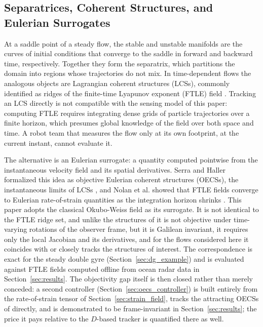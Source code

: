 \documentclass[lettersize,journal]{IEEEtran}
\begin{document}
\subsection{Separatrices, Coherent Structures, and Eulerian Surrogates}
\label{sec:separatrix}

At a saddle point of a steady flow, the stable and unstable manifolds are
the curves of initial conditions that converge to the saddle in forward
and backward time, respectively. Together they form the separatrix, which
partitions the domain into regions whose trajectories do not mix. In
time-dependent flows the analogous objects are Lagrangian coherent
structures (LCSs), commonly identified as ridges of the finite-time
Lyapunov exponent (FTLE) field \cite{6,7,8}. Tracking an LCS directly is not
compatible with the sensing model of this paper: computing FTLE requires
integrating dense grids of particle trajectories over a finite horizon,
which presumes global knowledge of the field over both space and time. A
robot team that measures the flow only at its own footprint, at the
current instant, cannot evaluate it.

The alternative is an Eulerian surrogate: a quantity computed pointwise
from the instantaneous velocity field and its spatial derivatives. Serra
and Haller formalized this idea as objective Eulerian coherent structures
(OECSs), the instantaneous limits of LCSs \cite{17}, and Nolan et al. showed
that FTLE fields converge to Eulerian rate-of-strain quantities as the
integration horizon shrinks \cite{18}. This paper adopts the classical
Okubo-Weiss field as its surrogate. It is not identical to the FTLE ridge
set, and unlike the structures of \cite{17} it is not objective under
time-varying rotations of the observer frame, but it is Galilean
invariant, it requires only the local Jacobian and its derivatives, and
for the flows considered here it coincides with or closely tracks the
structures of interest. The correspondence is exact for the steady double
gyre (Section~\ref{sec:dg_example}) and is evaluated against FTLE fields
computed offline from ocean radar data in Section~\ref{sec:results}. The
objectivity gap itself is then closed rather than merely conceded: a
second controller (Section~\ref{sec:oecs_controller}) is built entirely
from the rate-of-strain tensor of Section~\ref{sec:strain_field}, tracks
the attracting OECSs of \cite{17} directly, and is demonstrated to be
frame-invariant in Section~\ref{sec:results}; the price it pays relative
to the $D$-based tracker is quantified there as well.
\end{document}

